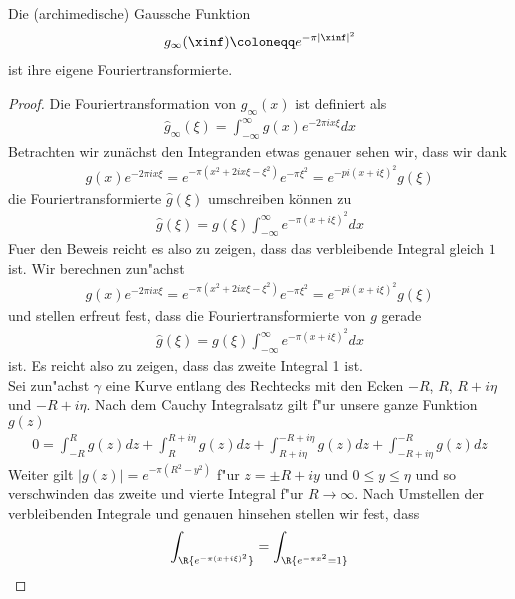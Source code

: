 %
	\begin{satz}
		Die (archimedische) Gaussche Funktion
		\begin{align}
			g_\infty(\xinf) \coloneqq  e^{-\pi |\xinf|^2}
		\end{align}
		ist ihre eigene Fouriertransformierte.
	\end{satz}

	\begin{proof}
		Die Fouriertransformation von $g_\infty(x)$ ist definiert als
		\begin{align*}
			\hat{g}_\infty (\xi) = \int_{-\infty}^{\infty}{g(x)e^{-2\pi i x \xi}dx}
		\end{align*}
		Betrachten wir zunächst den Integranden etwas genauer sehen wir, dass wir dank
		\begin{align*}
			g(x)e^{-2\pi i x \xi} = e^{-\pi(x^2 +2 i x \xi - \xi ^2)}e^{-\pi \xi^2} = e^{-pi (x + i \xi)^2} g(\xi)
		\end{align*}
		die Fouriertransformierte $\hat{g} (\xi)$ umschreiben können zu
		\begin{align*}
			\hat{g}(\xi) = g(\xi) \int_{-\infty}^{\infty} {e^{-\pi(x+i\xi)^2}dx}
		\end{align*}
		Fuer den Beweis reicht es also zu zeigen, dass das verbleibende Integral gleich $1$ ist.
		Wir berechnen zun"achst
		\begin{align*}
			g(x)e^{-2\pi i x \xi} = e^{-\pi(x^2 +2 i x \xi - \xi ^2)}e^{-\pi \xi^2} = e^{-pi (x + i \xi)^2} g(\xi)
		\end{align*}
		und stellen erfreut fest, dass die Fouriertransformierte von $g$ gerade
		\begin{align*}
			\hat{g}(\xi) = g(\xi) \int_{-\infty}^{\infty} e^{-\pi(x+i\xi)^2}dx
		\end{align*}
		ist. Es reicht also zu zeigen, dass das zweite Integral 1 ist.\\
		Sei zun"achst $\gamma$ eine Kurve entlang des Rechtecks mit den Ecken $-R$, $R$, $R+i\eta$ und $-R+i\eta$. 
		Nach dem Cauchy Integralsatz gilt f"ur unsere ganze Funktion $g(z)$
		\begin{align*}
			0 = \int_{-R}^{R} {g(z)dz} + \int_{R}^{R+i\eta} {g(z)dz}  + \int_{R+i\eta}^{-R+i\eta} {g(z)dz}  + \int_{-R+i\eta}^{-R} {g(z)dz} 
		\end{align*}
		Weiter gilt $|g(z)|=e^{-\pi (R^2 - y^2)}$ f"ur $z=\pm R + i y$ und $0\leq y \leq \eta$ und so verschwinden das zweite und vierte Integral f"ur $R\rightarrow \infty$. 
		Nach Umstellen der verbleibenden Integrale und genauen hinsehen stellen wir fest, dass
		\begin{align*}
			\int_\R{e^{-\pi (x + i\xi)^2}} = \int_\R {e^{-\pi x^2} = 1}
		\end{align*}
	\end{proof}
	
